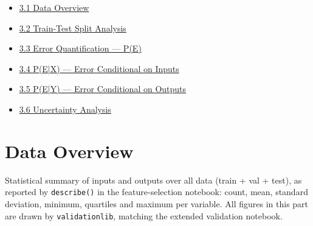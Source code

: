\documentclass[9pt,a4paper]{article}
\begin{document}
\vspace{4pt}
\begin{itemize}[leftmargin=2em,itemsep=1pt,topsep=2pt]
  \item \hyperref[sec:d1]{3.1 Data Overview}
  \item \hyperref[sec:d2]{3.2 Train-Test Split Analysis}
  \item \hyperref[sec:d3]{3.3 Error Quantification --- P(E)}
  \item \hyperref[sec:d4]{3.4 P(E|X) --- Error Conditional on Inputs}
  \item \hyperref[sec:d5]{3.5 P(E|Y) --- Error Conditional on Outputs}
  \item \hyperref[sec:d6]{3.6 Uncertainty Analysis}
\end{itemize}

\clearpage
\section{Data Overview}
\label{sec:d1}

Statistical summary of inputs and outputs over all data (train + val + test), as reported by \texttt{describe()} in the feature-selection notebook: count, mean, standard deviation, minimum, quartiles and maximum per variable. All figures in this part are drawn by \texttt{validationlib}, matching the extended validation notebook.
\end{document}
